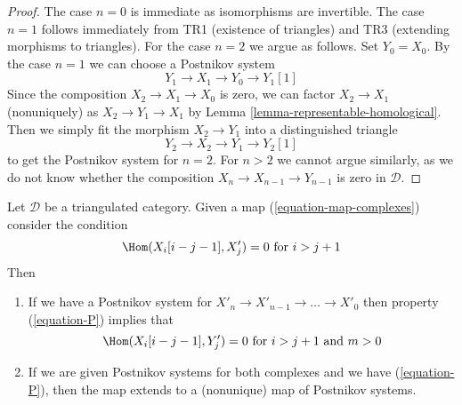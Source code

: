 \begin{proof}
The case $n = 0$ is immediate as isomorphisms are invertible.
The case $n = 1$ follows immediately from TR1 (existence of triangles)
and TR3 (extending morphisms to triangles).
For the case $n = 2$ we argue as follows.
Set $Y_0 = X_0$. By the case $n = 1$ we can choose
a Postnikov system
$$
Y_1 \to X_1 \to Y_0 \to Y_1[1]
$$
Since the composition $X_2 \to X_1 \to X_0$ is zero, we can factor
$X_2 \to X_1$ (nonuniquely) as $X_2 \to Y_1 \to X_1$ by
Lemma \ref{lemma-representable-homological}.
Then we simply fit the morphism $X_2 \to Y_1$ into a distinguished
triangle
$$
Y_2 \to X_2 \to Y_1 \to Y_2[1]
$$
to get the Postnikov system for $n = 2$.
For $n > 2$ we cannot argue similarly, as we do not
know whether the composition $X_n \to X_{n - 1} \to Y_{n - 1}$
is zero in $\mathcal{D}$.
\end{proof}

\begin{lemma}
\label{lemma-maps-postnikov-systems-vanishing}
Let $\mathcal{D}$ be a triangulated category. Given a map
(\ref{equation-map-complexes}) consider the condition
\begin{equation}
\label{equation-P}
\Hom(X_i[i - j - 1], X'_j) = 0 \text{ for }i > j + 1
\end{equation}
Then
\begin{enumerate}
\item If we have a Postnikov system for
$X'_n \to X'_{n - 1} \to \ldots \to X'_0$ then
property (\ref{equation-P}) implies that
$$
\Hom(X_i[i - j - 1], Y'_j) = 0 \text{ for }i > j + 1\text{ and }m > 0
$$
\item If we are given Postnikov systems for both complexes and
we have (\ref{equation-P}), then the map extends to a (nonunique) map
of Postnikov systems.
\end{enumerate}
\end{lemma}

